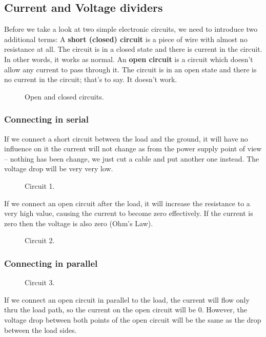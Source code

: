 \subsection{Current and Voltage dividers}
Before we take a look at two simple electronic circuits, we need to introduce two additional terms:
A \textbf{short (closed) circuit} is a piece of wire with almost no resistance at all. The circuit is in a closed state and there is current in the circuit. In other words, it works as normal.
An \textbf{open circuit} is a circuit which doesn't allow any current to pass through it. The circuit is in an open state and there is no current in the circuit; that’s to say. It doesn’t work.
\begin{figure}
    \centering
    
    \caption{Open and closed circuits.} \label{fig:open_closed_circuits}
\end{figure}
\subsubsection{Connecting in serial}
If we connect a short circuit between the load and the ground, it will have no influence on it the current will not change as from the power supply point of view – nothing has been change, we just cut a cable and put another one instead. The voltage drop will be very very low.
\begin{figure}
    \centering
    
    \caption{Circuit 1.} \label{fig:circuit1}
\end{figure}
If we connect an open circuit after the load, it will increase the resistance to a very high value, causing the current to become zero effectively. If the current is zero then the voltage is also zero (Ohm’s Law).
\begin{figure}
    \centering
    
    \caption{Circuit 2.} \label{fig:circuit2}
\end{figure}

\subsubsection{Connecting in parallel}
\begin{figure}
    \centering
    
    \caption{Circuit 3.} \label{fig:circuit3}
\end{figure}
If we connect an open circuit in parallel to the load, the current will flow only thru the load path, so the current on the open circuit will be 0. However, the voltage drop between both points of the open circuit will be the same as the drop between the load sides.

